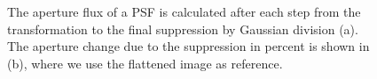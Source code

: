 \begin{figure}[H]
	\centering
\caption{The aperture flux of a PSF is calculated after each step from the transformation to the final suppression by Gaussian division (a). The aperture change due to the suppression in percent is shown in (b), where we use the flattened image as reference.}
\label{fig:PSF1000_apertures}
\end{figure}

